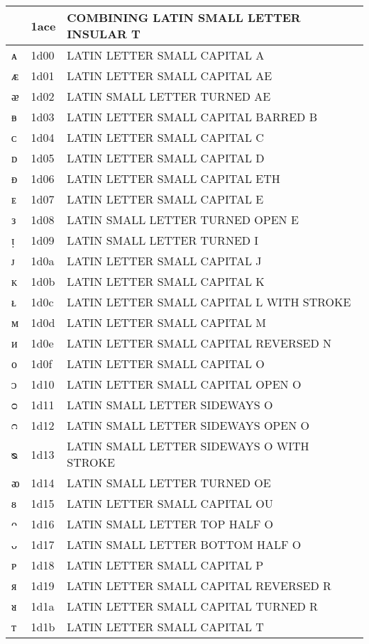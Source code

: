 \documentclass[12pt,letterpaper,openany]{book}
\begin{document}
\begin{center}
\begin{supertabular}{|m{0.25in}|m{0.5in}|m{4in}|}
◌ᫎ & 1ace & COMBINING LATIN SMALL LETTER INSULAR T\\\hline
ᴀ & 1d00 & LATIN LETTER SMALL CAPITAL A\\\hline
ᴁ & 1d01 & LATIN LETTER SMALL CAPITAL AE\\\hline
ᴂ & 1d02 & LATIN SMALL LETTER TURNED AE\\\hline
ᴃ & 1d03 & LATIN LETTER SMALL CAPITAL BARRED B\\\hline
ᴄ & 1d04 & LATIN LETTER SMALL CAPITAL C\\\hline
ᴅ & 1d05 & LATIN LETTER SMALL CAPITAL D\\\hline
ᴆ & 1d06 & LATIN LETTER SMALL CAPITAL ETH\\\hline
ᴇ & 1d07 & LATIN LETTER SMALL CAPITAL E\\\hline
ᴈ & 1d08 & LATIN SMALL LETTER TURNED OPEN E\\\hline
ᴉ & 1d09 & LATIN SMALL LETTER TURNED I\\\hline
ᴊ & 1d0a & LATIN LETTER SMALL CAPITAL J\\\hline
ᴋ & 1d0b & LATIN LETTER SMALL CAPITAL K\\\hline
ᴌ & 1d0c & LATIN LETTER SMALL CAPITAL L WITH STROKE\\\hline
ᴍ & 1d0d & LATIN LETTER SMALL CAPITAL M\\\hline
ᴎ & 1d0e & LATIN LETTER SMALL CAPITAL REVERSED N\\\hline
ᴏ & 1d0f & LATIN LETTER SMALL CAPITAL O\\\hline
ᴐ & 1d10 & LATIN LETTER SMALL CAPITAL OPEN O\\\hline
ᴑ & 1d11 & LATIN SMALL LETTER SIDEWAYS O\\\hline
ᴒ & 1d12 & LATIN SMALL LETTER SIDEWAYS OPEN O\\\hline
ᴓ & 1d13 & LATIN SMALL LETTER SIDEWAYS O WITH STROKE\\\hline
ᴔ & 1d14 & LATIN SMALL LETTER TURNED OE\\\hline
ᴕ & 1d15 & LATIN LETTER SMALL CAPITAL OU\\\hline
ᴖ & 1d16 & LATIN SMALL LETTER TOP HALF O\\\hline
ᴗ & 1d17 & LATIN SMALL LETTER BOTTOM HALF O\\\hline
ᴘ & 1d18 & LATIN LETTER SMALL CAPITAL P\\\hline
ᴙ & 1d19 & LATIN LETTER SMALL CAPITAL REVERSED R\\\hline
ᴚ & 1d1a & LATIN LETTER SMALL CAPITAL TURNED R\\\hline
ᴛ & 1d1b & LATIN LETTER SMALL CAPITAL T\\\hline

\end{supertabular}
\end{center}
\end{document}

